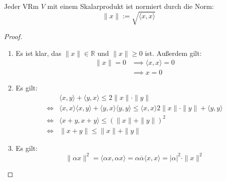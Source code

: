 \documentclass[parskip,a4paper,twoside,DIV15,BCOR12mm]{scrbook}
\begin{document}
\begin{comment}
Im Spezialfall $V=\mathbb{K}^n$ mit dem Standardskalarprodukt $\langle\cdot,\cdot\rangle$
gilt nach der Cauchy-Schwarzschen Ungleichung:
\[|\sum_{i=1}^n \xi_i\cdot\overline{\eta_i}|^2\le (\sum_{i=1}^n |\xi_i|^2)(\sum_{j=1}^n |\eta_j|^2)\]
\end{comment}

\begin{theo}
\label{Satz 16.2}
Jeder VRm $V$ mit einem Skalarprodukt ist normiert durch die Norm:
\[\|x\|:=\sqrt{\langle x,x\rangle}\]
\end{theo}

\begin{proof}
\begin{enumerate}
\item Es ist klar, das $\|x\|\in\mathbb{R}$ und $\|x\|\ge 0$ ist. Außerdem gilt:
\begin{align*}
\|x\|=0 &\implies \langle x,x\rangle =0\\
&\implies x=0
\end{align*}
\item  Es gilt:
\begin{align*}
&\langle x,y\rangle +\langle y,x\rangle\le 2\|x\|\cdot\|y\|\\
\iff &\langle x,x\rangle\langle x,y\rangle +\langle y,x\rangle\langle y,y\rangle
\le \langle x,x\rangle 2\|x\|\cdot\|y\|+\langle y,y\rangle\\
\iff &\langle x+y,x+y\rangle \le (\|x\|+\|y\|)^2\\
\iff &\|x+y\|\le \|x\|+\|y\|
\end{align*}
\item Es gilt:
\[\|\alpha x\|^2=\langle \alpha x,\alpha x\rangle = \alpha\overline\alpha
\langle x,x\rangle = |\alpha|^2\cdot\|x\|^2\]
\end{enumerate}
\end{proof}

\begin{comment}
\index{Parallelogrammgleichung}
\begin{enumerate}
\item Mit Hilfe der Norm lautet die Cauchy-Schwarzsche Ungleichung:
\[|\langle x,y\rangle|\le \|x\|\cdot\|y\|\]
\item Damit eine Norm von einem Skalarprodukt stammt, ist offenbar notwendig,
dass sie die \textbf{Parallelogrammgleichung} erfüllt:
\[\forall x,y\in V: \|x+y\|^2+\|x-y\|^2=2(\|x\|^2+\|y\|^2)\]
Denn falls die Norm $\|\cdot\|$ von einem Skalarprodukt $\langle\cdot,\cdot\rangle$
kommt, gilt:
\begin{align*}
\|x+y\|^2+\|x-y\|^2 &= \langle x+y,x+y\rangle +\langle x-y,x-y\rangle\\
&= \|x\|^2+\langle x,y\rangle +\langle y,x\rangle+\|y\|^2 + 
\|x\|^2-\langle x,y\rangle -\langle y,x\rangle+\|y\|^2\\
&= 2(\|x\|^2+\|y\|^2)
\end{align*}
Tatsächlich kommt eine Norm genau dann von einem Skalarprodukt, wenn sie die
Parallelogrammgleichung erfüllt. Dies wird jedoch ohne Beweis angegeben.
\end{enumerate}
\end{comment}
\end{document}
